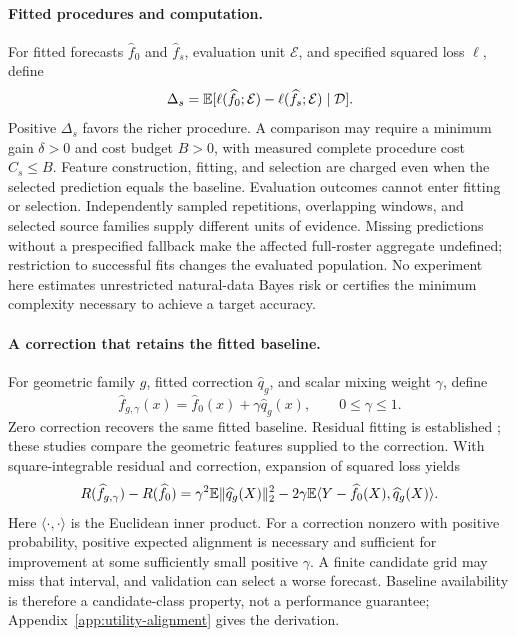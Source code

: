 \paragraph{Fitted procedures and computation.}
For fitted forecasts $\widehat f_0$ and $\widehat f_s$, evaluation unit
$\mathcal E$, and specified squared loss $\ell$, define
\begin{equation}\label{eq:utility-delta}
 \Delta_s=\mathbb{E}[\ell(\widehat f_0;\mathcal E)
             -\ell(\widehat f_s;\mathcal E)\mid\mathcal D].
\end{equation}
Positive $\Delta_s$ favors the richer procedure. A comparison may require
a minimum gain $\delta>0$ and cost budget $B>0$, with measured complete
procedure cost $C_s\leq B$. Feature construction, fitting, and selection
are charged even when the selected prediction equals the baseline.
Evaluation outcomes cannot enter fitting or selection. Independently
sampled repetitions, overlapping windows, and selected source families
supply different units of evidence. Missing predictions without a
prespecified fallback make the affected full-roster aggregate undefined;
restriction to successful fits changes the evaluated population. No
experiment here estimates unrestricted natural-data Bayes risk or
certifies the minimum complexity necessary to achieve a target accuracy.

\paragraph{A correction that retains the fitted baseline.}
For geometric family $g$, fitted correction $\widehat q_g$, and scalar
mixing weight $\gamma$, define
\begin{equation}\label{eq:utility-additive}
 \widehat f_{g,\gamma}(x)
 =\widehat f_0(x)+\gamma\widehat q_g(x),\qquad 0\leq\gamma\leq1.
\end{equation}
Zero correction recovers the same fitted baseline. Residual fitting is
established \citep{Buhlmann2003L2}; these studies compare the geometric
features supplied to the correction. With square-integrable residual
and correction, expansion of squared loss yields
\begin{equation}\label{eq:utility-alignment}
 R(\widehat f_{g,\gamma})-R(\widehat f_0)
 =\gamma^2\mathbb{E}\|\widehat q_g(X)\|_2^2
 -2\gamma\mathbb{E}\langle Y-\widehat f_0(X),\widehat q_g(X)\rangle.
\end{equation}
Here $\langle\cdot,\cdot\rangle$ is the Euclidean inner product.
For a correction nonzero with positive probability, positive expected
alignment is necessary and sufficient for improvement at some
sufficiently small positive $\gamma$. A finite candidate grid may miss
that interval, and validation can select a worse forecast. Baseline
availability is therefore a candidate-class property, not a performance
guarantee; Appendix~\ref{app:utility-alignment} gives the derivation.
